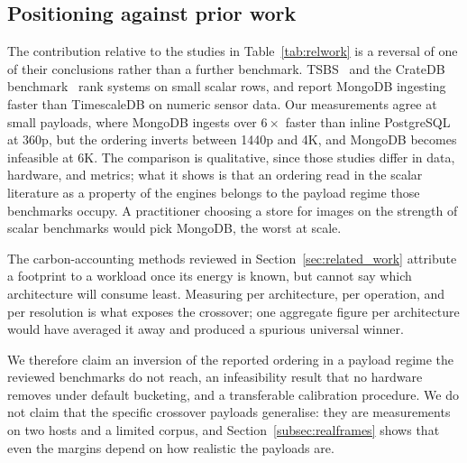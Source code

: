 \documentclass[pdflatex,sn-basic]{sn-jnl}%
\begin{document}
\subsection{Positioning against prior work}
The contribution relative to the studies in Table~\ref{tab:relwork} is a reversal of one of their conclusions rather than a further benchmark. TSBS~\citep{tsbs} and the CrateDB benchmark~\citep{cratedb_ts_benchmark} rank systems on small scalar rows, and \citet{diva_timescaledb_mongodb_eval} report MongoDB ingesting faster than TimescaleDB on numeric sensor data. Our measurements agree at small payloads, where MongoDB ingests over $6\times$ faster than inline PostgreSQL at 360p, but the ordering inverts between 1440p and 4K, and MongoDB becomes infeasible at 6K. The comparison is qualitative, since those studies differ in data, hardware, and metrics; what it shows is that an ordering read in the scalar literature as a property of the engines belongs to the payload regime those benchmarks occupy. A practitioner choosing a store for images on the strength of scalar benchmarks would pick MongoDB, the worst at scale.

The carbon-accounting methods reviewed in Section~\ref{sec:related_work} attribute a footprint to a workload once its energy is known, but cannot say which architecture will consume least. Measuring per architecture, per operation, and per resolution is what exposes the crossover; one aggregate figure per architecture would have averaged it away and produced a spurious universal winner.

We therefore claim an inversion of the reported ordering in a payload regime the reviewed benchmarks do not reach, an infeasibility result that no hardware removes under default bucketing, and a transferable calibration procedure. We do not claim that the specific crossover payloads generalise: they are measurements on two hosts and a limited corpus, and Section~\ref{subsec:realframes} shows that even the margins depend on how realistic the payloads are.
\end{document}
